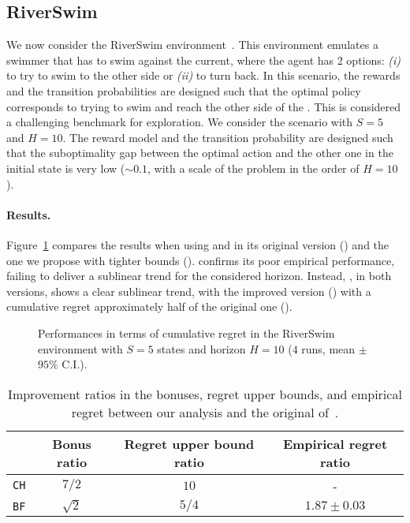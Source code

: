 \subsection{RiverSwim}
We now consider the RiverSwim environment~\citep{strehl2008analysis}. This environment emulates a swimmer that has to swim against the current, where the agent has 2 options: \emph{(i)} to try to swim to the other side or \emph{(ii)} to turn back. In this scenario, the rewards and the transition probabilities are designed such that the optimal policy corresponds to trying to swim and reach the other side of the . This is considered a challenging benchmark for exploration. We consider the scenario with $S=5$ and $H=10$. The reward model and the transition probability are designed such that the suboptimality gap between the optimal action and the other one in the initial state is very low ($\sim\!0.1$, with a scale of the problem in the order of $H=10$).

\paragraph{Results.}
Figure~\ref{fig:river} compares the results when using \mvp and \ucbvi in its original version (\ucbvibf) and the one we propose with tighter bounds (\ucbvibfi). \mvp confirms its poor empirical performance, failing to deliver a sublinear trend for the considered horizon. Instead, \ucbvi, in both versions, shows a clear sublinear trend, with the improved version (\ucbvibfi) with a cumulative regret approximately half of the original one (\ucbvibf).

\begin{figure}[t!]
\centering
{}
\caption{Performances in terms of cumulative regret in the RiverSwim environment with $S=5$ states and horizon $H=10$ ($4$ runs, mean $\pm$ $95\%$ C.I.).}
\label{fig:river}
\end{figure}

\begin{table}[t!]
    \centering
    \begin{tabular}{c|ccc}
        \hline 
        & Bonus ratio & Regret upper bound ratio &  Empirical regret ratio\\ \hline
        \texttt{CH} & $7/2$ & $10$ & - \\ \hline
        \texttt{BF} & $\sqrt{2}$ & $5/4$ & $1.87 \pm 0.03$ \\ \hline
    \end{tabular}
    \caption{Improvement ratios in the bonuses, regret upper bounds, and empirical regret between our analysis and the original of~\citep{azar2017minimax}.}
    \label{tab:ratios}
\end{table}

